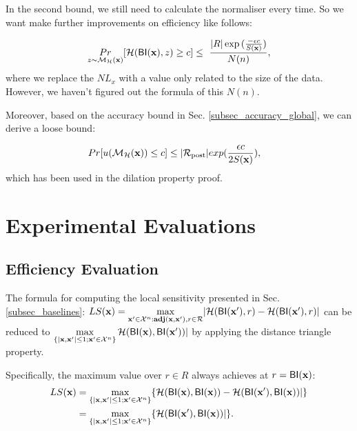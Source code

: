 \documentclass{article}
\begin{document}
In the second bound, we still need to calculate the normaliser every time. So we want make further improvements on efficiency like follows:

\begin{equation*}
\underset{z \thicksim \mathcal{M}_{\mathcal{H}}(\textbf{x})}{Pr}[\mathcal{H}(\mathsf{BI}(\textbf{x}), z) \geq c] \leq \ \frac{|R| \exp{(\frac{- \epsilon c}{S(\textbf{x})}})}{N(n)},
\end{equation*}
where we replace the $NL_x$ with a value only related to the size of the data. However, we haven't figured out the formula of this $N(n)$.

Moreover, based on the accuracy bound in Sec. \ref{subsec_accuracy_global}, we can derive a loose bound:

\begin{equation*}
\begin{split}
Pr[u(\mathcal{M}_{\mathcal{H}}(\textbf{x})) \leq c] 
& \leq |\mathcal{R}_{\textup{post}}|exp(\frac{\epsilon c}{2 S(\textbf{x})}),
\end{split}
\end{equation*}
which has been used in the dilation property proof.




\section{Experimental Evaluations}
\label{sec_experiment}

\subsection{Efficiency Evaluation}
\label{subsec_effi}
The formula for computing the local sensitivity presented in Sec. \ref{subsec_baselines}: $LS(\textbf{x})=\max\limits_{\textbf{x}' \in \mathcal{X}^n:\textbf{adj}(\textbf{x},\textbf{x}'), r\in \mathcal{R}}\lvert \mathcal{H}(\mathsf{BI}(\textbf{x}'), r) - \mathcal{H}(\mathsf{BI}(\textbf{x}'), r)\rvert$ 
can be reduced to $\max\limits_{\{|\textbf{x},\textbf{x}'| \leq 1; \textbf{x}'\in \mathcal{X}^n\}}\mathcal{H}(\mathsf{BI}(\textbf{x}), \mathsf{BI}(\textbf{x}'))|$
by applying the distance triangle property. 

Specifically, the maximum value over ${r \in R}$ always achieves at $r = \mathsf{BI}(\textbf{x})$:
\begin{equation*}
\begin{split}
LS(\textbf{x}) 
  & = \max\limits_{\{|\textbf{x},\textbf{x}'| \leq 1;\textbf{x}'\in \mathcal{X}^n\}} \{\mathcal{H}(\mathsf{BI}(\textbf{x}), \mathsf{BI}(\textbf{x})) - \mathcal{H}(\mathsf{BI}(\textbf{x}'), \mathsf{BI}(\textbf{x}))|\} \\
  & = \max\limits_{\{|\textbf{x},\textbf{x}'| \leq 1;\textbf{x}'\in \mathcal{X}^n\}} \{\mathcal{H}(\mathsf{BI}(\textbf{x}'), \mathsf{BI}(\textbf{x}))|\}.
\end{split}
\end{equation*}
\end{document}

